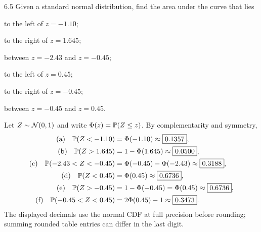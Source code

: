 \documentclass[11pt,oneside]{article}
\begin{document}
\begin{exercise}{6.5}
Given a standard normal distribution, find the area under the curve that lies
\begin{exercisesubparts}
\item to the left of $z=-1.10$;
\item to the right of $z=1.645$;
\item between $z=-2.43$ and $z=-0.45$;
\item to the left of $z=0.45$;
\item to the right of $z=-0.45$;
\item between $z=-0.45$ and $z=0.45$.
\end{exercisesubparts}
\end{exercise}
\begin{solution}
Let $Z\sim\mathcal{N}(0,1)$ and write $\Phi(z)=\mathbb{P}(Z\le z)$. By complementarity and symmetry,
\begin{align*}
\textup{(a)}\quad\mathbb{P}(Z<-1.10)&=\Phi(-1.10)\approx\boxed{0.1357},\\
\textup{(b)}\quad\mathbb{P}(Z>1.645)&=1-\Phi(1.645)\approx\boxed{0.0500},\\
\textup{(c)}\quad\mathbb{P}(-2.43<Z<-0.45)&=\Phi(-0.45)-\Phi(-2.43)\approx\boxed{0.3188},\\
\textup{(d)}\quad\mathbb{P}(Z<0.45)&=\Phi(0.45)\approx\boxed{0.6736},\\
\textup{(e)}\quad\mathbb{P}(Z>-0.45)&=1-\Phi(-0.45)=\Phi(0.45)\approx\boxed{0.6736},\\
\textup{(f)}\quad\mathbb{P}(-0.45<Z<0.45)&=2\Phi(0.45)-1\approx\boxed{0.3473}.
\end{align*}
The displayed decimals use the normal CDF at full precision before rounding; summing rounded table entries can differ in the last digit.
\end{solution}
\end{document}
